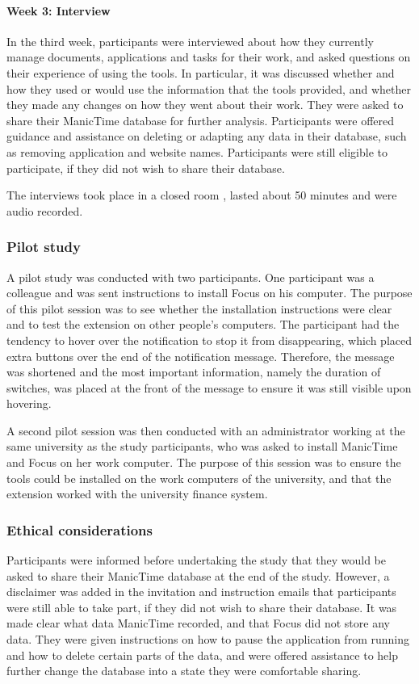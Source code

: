 \paragraph{Week 3: Interview}
In the third week, participants were interviewed about how they currently manage documents, applications and tasks for their work, and asked questions on their experience of using the tools. In particular, it was discussed whether and how they used or would use the information that the tools provided, and whether they made any changes on how they went about their work. They were asked to share their ManicTime database for further analysis. Participants were offered guidance and assistance on deleting or adapting any data in their database, such as removing application and website names. Participants were still eligible to participate, if they did not wish to share their database.

The interviews took place in a closed room , lasted about 50 minutes and were audio recorded.

\subsubsection{Pilot study}
A pilot study was conducted with two participants. One participant was a colleague and was sent instructions to install Focus on his computer. The purpose of this pilot session was to see whether the installation instructions were clear and to test the extension on other people's computers. The participant had the tendency to hover over the notification to stop it from disappearing, which placed extra buttons over the end of the notification message. Therefore, the message was shortened and the most important information, namely the duration of switches, was placed at the front of the message to ensure it was still visible upon hovering.

A second pilot session was then conducted with an administrator working at the same university as the study participants, who was asked to install ManicTime and Focus on her work computer. The purpose of this session was to ensure the tools could be installed on the work computers of the university, and that the extension worked with the university finance system.


\subsubsection{Ethical considerations}
Participants were informed before undertaking the study that they would be asked to share their ManicTime database at the end of the study. However, a disclaimer was added in the invitation and instruction emails that participants were still able to take part, if they did not wish to share their database. It was made clear what data ManicTime recorded, and that Focus did not store any data. They were given instructions on how to pause the application from running and how to delete certain parts of the data, and were offered assistance to help further change the database into a state they were comfortable sharing. 

